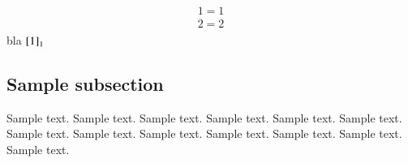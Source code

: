 \begin{align}
\begin{aligned}   \label{1}
1=1 \\
2=2 
\end{aligned}
\end{align}
bla ${\eqref{1}}_{1}$

\subsection{Sample subsection} \label{subsec1}

Sample text. Sample text. Sample text. Sample text. Sample text. Sample text. 
Sample text. Sample text. Sample text. Sample text. Sample text. Sample text. 
Sample text. 